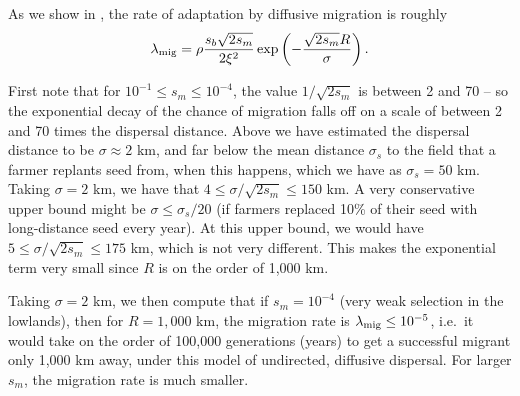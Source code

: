 As we show in \citet{ralph2014convergent}, 
the rate of adaptation by diffusive migration is roughly
\begin{align*}
  \lambda_{\text{mig}} = \rho \frac{s_b \sqrt{2 s_m}}{2\xi^2} \exp\left(- \frac{\sqrt{2 s_m}R}{\sigma} \right) .
\end{align*}


First note that for $10^{-1} \le s_m \le 10^{-4}$, the value $1/\sqrt{2s_m}$ is between 2 and 70 --
so the exponential decay of the chance of migration falls off on a scale of between 2 and 70 times the dispersal distance.
Above we have estimated the dispersal distance to be $\sigma \approx 2$ km,
and far below the mean distance $\sigma_s$ to the field that a farmer replants seed from, when this happens,
which we have as $\sigma_s = 50$ km.
Taking $\sigma=2$ km, we have that $4 \le \sigma/\sqrt{2s_m} \le 150$ km.
A very conservative upper bound might be $\sigma \le \sigma_s/20$ (if farmers replaced 10\% of their seed with long-distance seed every year).
At this upper bound, we would have $5 \le \sigma/\sqrt{2s_m} \le 175$ km,
which is not very different.
This makes the exponential term very small since $R$ is on the order of 1,000 km.

Taking $\sigma=2$ km, we then compute that 
if $s_m = 10^{-4}$ (very weak selection in the lowlands), then for $R=1,000$ km, the migration rate is $\lambda_{\text{mig}} \le 10^{-5}$,
i.e.\ it would take on the order of 100,000 generations (years) to get a successful migrant only 1,000 km away,
under this model of undirected, diffusive dispersal.
For larger $s_m$, the migration rate is much smaller.

